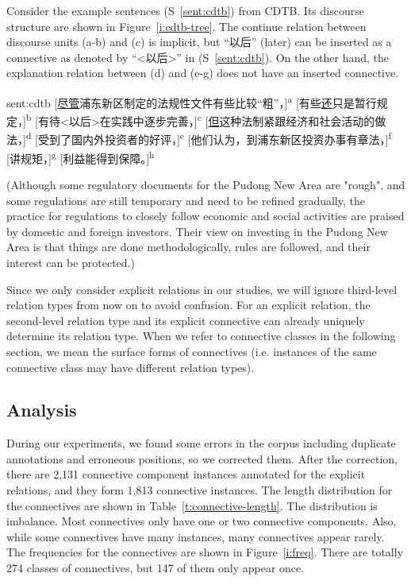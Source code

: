 Consider the example sentences (S~\ref{sent:cdtb}) from CDTB. Its discourse
structure are shown in Figure~\ref{i:cdtb-tree}. The continue relation between
discourse units (a-b) and (c) is implicit, but ``以后'' (later) can be inserted
as a connective as denoted by ``<以后>'' in (S~\ref{sent:cdtb}).
On the other hand, the explanation relation between (d) and (e-g)
does not have an inserted connective.


\begin{sent}{sent:cdtb}{}
    [\underline{尽管}浦东新区制定的法规性文件有些比较``粗''，]\textsuperscript{a}
    [有些\underline{还}只是暂行规定，]\textsuperscript{b}
    [有待<以后>在实践中逐步完善，]\textsuperscript{c}
    [\underline{但}这种法制紧跟经济和社会活动的做法，]\textsuperscript{d}
    [受到了国内外投资者的好评，]\textsuperscript{e}
    [他们认为，到浦东新区投资办事有章法，]\textsuperscript{f}
    [讲规矩，]\textsuperscript{g}
    [利益能得到保障。]\textsuperscript{h}

    (Although some regulatory documents for the Pudong New Area are "rough",
    and some regulations are still temporary and
    need to be refined gradually,
    the practice for regulations to closely follow economic and social activities
    are praised by domestic and foreign investors.
    Their view on investing in the Pudong New Area is that
    things are done methodologically,
    rules are followed,
    and their interest can be protected.)
\end{sent}



Since we only consider explicit relations in our studies, we will ignore
third-level relation types from now on to avoid confusion.
For an explicit relation, the second-level relation type and its explicit
connective can already uniquely determine its relation type.
When we refer to connective classes in the following section, we mean the
surface forms of connectives (i.e. instances of the same connective class
may have different relation types).

\subsection{Analysis}

During our experiments, we found some errors in the corpus including
duplicate annotations and erroneous positions, so we corrected
them. After the correction, there are 2,131 connective component instances
annotated for the explicit relations, and they form 1,813 connective instances.
The length distribution for the connectives are shown in Table~\ref{t:connective-length}.
The distribution is imbalance. Most connectives only have
one or two connective components. Also, while some connectives have many instances,
many connectives appear rarely. The frequencies for the connectives are shown
in Figure~\ref{i:freq}. There are totally 274 classes of connectives, but
147 of them only appear once.

